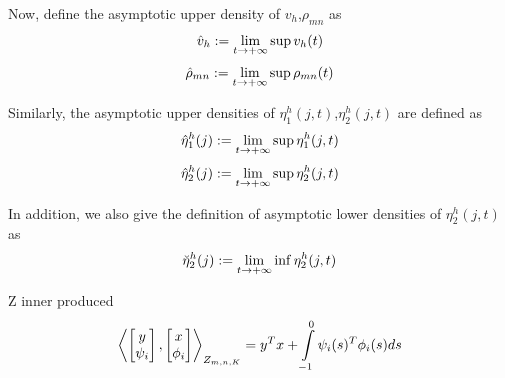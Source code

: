 \documentclass[twocolumn]{autart}    %
\begin{document}
\begin{defn}
    Now, define the asymptotic upper density of $v_{h}$,$\rho_{mn}$ as
    \begin{equation}
        \begin{aligned}
            \setlength{\arraycolsep}{0.9pt}
            \hat{v}_{h} := \lim_{t \rightarrow +\infty} \sup v_{h}(t)
        \end{aligned}
    \end{equation}
    \begin{equation}
        \begin{aligned}
            \setlength{\arraycolsep}{0.9pt}
            \hat{\rho}_{mn} := \lim_{t \rightarrow +\infty} \sup \rho_{mn}(t)
        \end{aligned}
    \end{equation}

    Similarly, the asymptotic upper densities of $\eta_{1}^{h}(j,t)$,$\eta_{2}^{h}(j,t)$ are defined as
    \begin{equation}
        \begin{aligned}
            \setlength{\arraycolsep}{0.9pt}
            \hat{\eta}^{h}_{1}(j) := \lim_{t \rightarrow +\infty} \sup \eta_{1}^{h}(j,t)
        \end{aligned}
    \end{equation}
    \begin{equation}
        \begin{aligned}
            \setlength{\arraycolsep}{0.9pt}
            \hat{\eta}^{h}_{2}(j) := \lim_{t \rightarrow +\infty} \sup \eta_{2}^{h}(j,t)
        \end{aligned}
    \end{equation}

    In addition, we also give the definition of asymptotic lower densities of $\eta_{2}^{h}(j,t)$ as
    \begin{equation}
        \begin{aligned}
            \setlength{\arraycolsep}{0.9pt}
            \breve{\eta}^{h}_{2}(j) := \lim_{t \rightarrow +\infty} \inf \eta_{2}^{h}(j,t)
        \end{aligned}
    \end{equation}
\end{defn}



Z inner produced
\begin{equation}
    \begin{aligned}
        \setlength{\arraycolsep}{0.9pt}
        \left<  \begin{bmatrix}
            y\\
            \psi_{i}
        \end{bmatrix},\begin{bmatrix}
            x\\
            \phi_{i}
        \end{bmatrix} \right>_{Z_{m,n,K}} =y^{T}x + \int_{-1}^{0}\psi_{i}(s)^{T}\phi_{i}(s)ds
    \end{aligned}
\end{equation}
\end{document}
